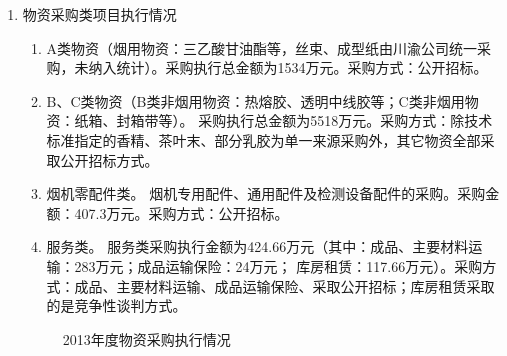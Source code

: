 \begin{enumerate}
  \item 物资采购类项目执行情况
   \begin{enumerate}[1、]
 \item A类物资（烟用物资：三乙酸甘油酯等，丝束、成型纸由川渝公司统一采购，未纳入统计）。采购执行总金额为1534万元。采购方式：公开招标。

 \item B、C类物资（B类非烟用物资：热熔胶、透明中线胶等；C类非烟用物资：纸箱、封箱带等）。
采购执行总金额为5518万元。采购方式：除技术标准指定的香精、茶叶末、部分乳胶为单一来源采购外，其它物资全部采取公开招标方式。

 \item 烟机零配件类。
烟机专用配件、通用配件及检测设备配件的采购。采购金额：407.3万元。采购方式：公开招标。

 \item 服务类。
服务类采购执行金额为424.66万元（其中：成品、主要材料运输：283万元；成品运输保险：24万元； 库房租赁：117.66万元）。采购方式：成品、主要材料运输、成品运输保险、采取公开招标；库房租赁采取的是竞争性谈判方式。
 \end{enumerate}


\begin{figure}[htpb]
\begin{minipage}{0.05\textwidth}
 \end{minipage}
\hfill
\begin{minipage}{0.85\textwidth}
\begin{flushleft}
\end{flushleft}
%
\vskip 3cm
%
 \begin{flushleft}
\end{flushleft}
 \end{minipage}
\vskip 6cm
\caption{2013年度物资采购执行情况}
\end{figure}




\end{enumerate}
